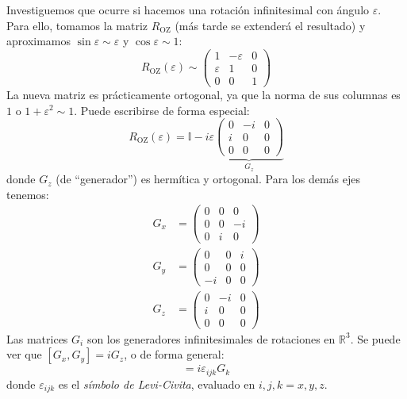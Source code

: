 Investiguemos que ocurre si hacemos una rotación infinitesimal con
ángulo $\varepsilon$. Para ello, tomamos la matriz $R_\text{OZ}$ (más
tarde se extenderá el resultado) y aproximamos $\sin \varepsilon \sim
\varepsilon$ y $\cos \varepsilon \sim 1$:
\begin{equation}
  R_\text{OZ}(\varepsilon) \sim
  \begin{pmatrix}
    1 & -\varepsilon & 0 \\
    \varepsilon &  1 & 0 \\
    0 & 0& 1
  \end{pmatrix}
\end{equation}
La nueva matriz es prácticamente ortogonal, ya que la norma de sus
columnas es $1$ o $1 + \varepsilon^2 \sim 1$. Puede escribirse de forma
especial:
\begin{equation}
  R_\text{OZ}(\varepsilon) = \mathbb{I} - i \varepsilon
  \underbrace{
   \begin{pmatrix}
    0 & -i & 0 \\
    i & 0 & 0 \\
    0 & 0 & 0 
  \end{pmatrix}}_{G_z}
\end{equation}
donde $G_z$ (de ``generador'') es hermítica y ortogonal. Para los
demás ejes tenemos:
\begin{align}
  G_x &=
  \begin{pmatrix}
    0 & 0 & 0 \\
    0&0 & -i  \\
    0&i&0 
  \end{pmatrix} \\
  G_y &=
  \begin{pmatrix}
    0 & 0 & i \\
    0&0 & 0  \\
    -i&0&0 
  \end{pmatrix} \\
  G_z &=
  \begin{pmatrix}
    0 & -i & 0 \\
    i&0 & 0  \\
    0&0&0 
  \end{pmatrix}
\end{align}
Las matrices $G_i$ son los generadores infinitesimales
de rotaciones
en $\mathbb{R}^3$. Se puede ver que $[G_x,G_y]=iG_z$, o de forma
general:
\begin{equation}
  [G_i,G_j] = i\varepsilon_{ijk} G_k
\end{equation}
donde $\varepsilon_{ijk}$ es el \emph{símbolo de Levi-Civita}, evaluado
en $i,j,k = x,y,z$.

